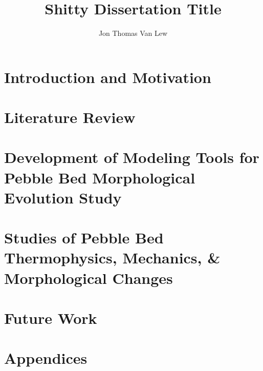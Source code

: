 \documentclass [PhD] {uclathes}
\title          {Shitty Dissertation Title}
\author         {Jon Thomas Van Lew}
\begin{document}



\tableofcontents               %
%



\part{Introduction and Motivation}



\part{Literature Review}





\part{Development of Modeling Tools for Pebble Bed Morphological Evolution Study}







\part{Studies of Pebble Bed Thermophysics, Mechanics, \&  Morphological Changes}






\part{Future Work}

\part{Appendices}
\appendix






\end{document}
